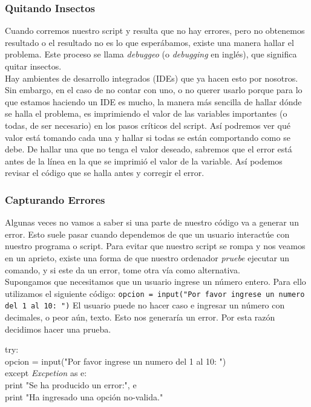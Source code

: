 \documentclass[10pt,letterpaper]{article}
\newcommand{\inlinecode}[1]{
\colorbox{light-gray}{\texttt{#1}}
}
\newenvironment{Code}
{
\begin{lrbox}{\selvestebox}%
\begin{minipage}{\dimexpr\columnwidth-2\fboxsep\relax}
\fontfamily{\ttdefault}\selectfont
}
{\end{minipage}\end{lrbox}%
\begin{center}
\colorbox{light-gray}{\usebox{\selvestebox}}
\end{center}
}
\begin{document}
\subsubsection{Quitando Insectos}
Cuando corremos nuestro script y resulta que no hay errores, pero no obtenemos resultado o el resultado no es lo que esper\'abamos, existe una manera hallar el problema. Este proceso se llama \emph{debuggeo} (o \emph{debugging} en ingl\'es), que significa quitar insectos.\\

Hay ambientes de desarrollo integrados (IDEs) que ya hacen esto por nosotros. Sin embargo, en el caso de no contar con uno, o no querer usarlo porque para lo que estamos haciendo un IDE es mucho, la manera m\'as sencilla de hallar d\'onde se halla el problema, es imprimiendo el valor de las variables importantes (o todas, de ser necesario) en los pasos cr\'iticos del script. As\'i podremos ver qu\'e valor est\'a tomando cada una y hallar si todas se est\'an comportando como se debe. De hallar una que no tenga el valor deseado, sabremos que el error est\'a antes de la l\'inea en la que se imprimi\'o el valor de la variable. As\'i podemos revisar el c\'odigo que se halla antes y corregir el error.

\subsubsection{Capturando Errores}
Algunas veces no vamos a saber si una parte de nuestro c\'odigo va a generar un error. Esto suele pasar cuando dependemos de que un usuario interact\'ue con nuestro programa o script. Para evitar que nuestro script se rompa y nos veamos en un aprieto, existe una forma de que nuestro ordenador \emph{pruebe} ejecutar un comando, y si este da un error, tome otra v\'ia como alternativa.\\

Supongamos que necesitamos que un usuario ingrese un n\'umero entero. Para ello utilizamos el siguiente c\'odigo: \inlinecode{opcion = input("Por favor ingrese un numero del 1 al 10: ")} El usuario puede no hacer caso e ingresar un n\'umero con decimales, o peor a\'un, texto. Esto nos generar\'ia un error. Por esta raz\'on decidimos hacer una prueba.

\begin{Code}
try:\\
\hspace*{4mm} opcion = input("Por favor ingrese un numero del 1 al 10: ")\\
except \textit{Excpetion} as e:\\
\hspace*{4mm} print "Se ha producido un error:", e\\
\hspace*{4mm} print "Ha ingresado una opci\'on no-valida."
\end{Code}
\end{document}
